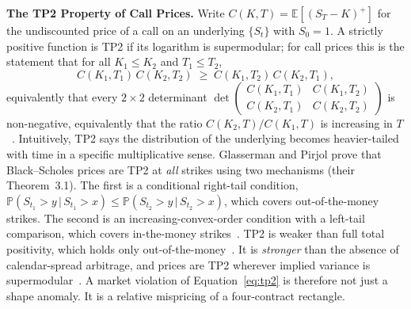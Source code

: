 \documentclass[sigconf,review,anonymous]{acmart}
\begin{document}
\medskip\noindent\textbf{The TP2 Property of Call Prices.}
\label{sec:tp2theory}
Write $C(K,T)=\mathbb{E}[(S_T-K)^+]$ for the undiscounted price of a call on an underlying $\{S_t\}$ with $S_0=1$. A strictly positive function is TP2 if its logarithm is supermodular; for call prices this is the statement that for all $K_1\le K_2$ and $T_1\le T_2$,
\begin{equation}
C(K_1,T_1)\,C(K_2,T_2)\;\ge\;C(K_1,T_2)\,C(K_2,T_1),
\label{eq:tp2}
\end{equation}
equivalently that every $2\times2$ determinant $\det\left(\begin{smallmatrix} C(K_1,T_1) & C(K_1,T_2)\\ C(K_2,T_1) & C(K_2,T_2)\end{smallmatrix}\right)$ is non-negative, equivalently that the ratio $C(K_2,T)/C(K_1,T)$ is increasing in $T$~\cite{glasserman2026tp2theory}. Intuitively, TP2 says the distribution of the underlying becomes heavier-tailed with time in a specific multiplicative sense. Glasserman and Pirjol prove that Black--Scholes prices are TP2 at \emph{all} strikes using two mechanisms (their Theorem~3.1). The first is a conditional right-tail condition, $\mathbb{P}(S_{t_1}>y\,|\,S_{t_1}>x)\le\mathbb{P}(S_{t_2}>y\,|\,S_{t_2}>x)$, which covers out-of-the-money strikes. The second is an increasing-convex-order condition with a left-tail comparison, which covers in-the-money strikes~\cite{glasserman2026tp2theory}. TP2 is weaker than full total positivity, which holds only out-of-the-money~\cite{glasserman2023convexity}. It is \emph{stronger} than the absence of calendar-spread arbitrage, and prices are TP2 wherever implied variance is supermodular~\cite{glasserman2026tp2theory}. A market violation of Equation~\eqref{eq:tp2} is therefore not just a shape anomaly. It is a relative mispricing of a four-contract rectangle.
\end{document}
